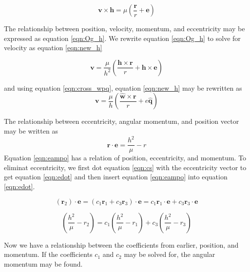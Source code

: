 \documentclass[12pt]{article}
\begin{document}
	\begin{equation}
	\mathbf { v } \times \mathbf { h } = \mu \left( \frac { \mathbf { r } } { r } + \mathbf { e } \right)
	\label{eqn:Og_h}
	\end{equation}
	
	The relationship between position, velocity, momentum, and eccentricity may be expressed as equation \ref{eqn:Og_h}. We rewrite equation \ref{eqn:Og_h} to solve for velocity as equation \ref{eqn:new_h}
	
	\begin{equation}
	\mathbf { v } = \frac { \mu } { h ^ { 2 } } \left( \frac { \mathbf { h } \times \mathbf { r } } { r } + \mathbf { h } \times \mathbf { e } \right)
	\label{eqn:new_h}
	\end{equation}

	
		and using equation \ref{eqn:cross_wpq}, equation \ref{eqn:new_h} may be rewritten as
	 \begin{equation}
	 \mathbf { v } = \frac { \mu } { h } \left( \frac { \hat { \mathbf { w } } \times \mathbf { r } } { r } + e \hat { \mathbf { q } } \right)
	 \label{eqn:almostDone}
	 \end{equation}
	 
	 The relationship between eccentricity, angular momentum, and position vector may be written as 
	 \begin{equation}
	 \mathbf { r } \cdot \mathbf { e } = \frac { h ^ { 2 } } { \mu } - r 
	 \label{eqn:eampo}
	 \end{equation}
	 Equation \ref{eqn:eampo} has a relation of position, eccentricity, and momentum. To eliminat eccentricity, we first dot equation \ref{eqn:cs} with the eccentricity vector to get equation \ref{eqn:edot} and then insert equation \ref{eqn:eampo} into equation \ref{eqn:edot}.
	 
	 \begin{equation}
	 \left(\mathbf{r}_2 \right)\cdot\mathbf{ e }= \left(c_1 \mathbf{ r }_1 + c_3 \mathbf{r}_3\right)\cdot\mathbf{ e }=c_1 \mathbf{ r }_1\cdot\mathbf{ e } + c_3 \mathbf{r}_3\cdot\mathbf{ e }
	 \label{eqn:edot}
	 \end{equation}
	 
	 
	 \begin{equation}
	 \left(\frac { h ^ { 2 } } { \mu } - r_2\right) =c_1 \left(\frac { h ^ { 2 } } { \mu } - r_1\right)  + c_3\left(\frac { h ^ { 2 } } { \mu } - r _3\right)
	 \label{eqn:edot2}
	 \end{equation}
	 
	 Now we have a relationship between the coefficients from earlier, position, and momentum. If the coefficients $c_1$ and $c_2$ may be solved for, the angular momentum may be found. 
	 
\end{document}
